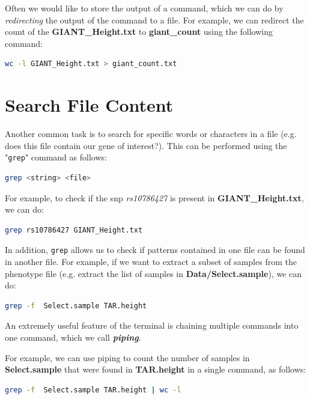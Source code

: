 \documentclass[12pt,openany]{scrbook}
\begin{document}
\noindent Often we would like to store the output of a command, which we can do by \textit{redirecting} the output of the command to a file. 
For example, we can redirect the count of the \textbf{GIANT\_Height.txt} to \textbf{giant\_count } using the following command: 

\begin{lstlisting}[language=bash]
wc -l GIANT_Height.txt > giant_count.txt 
\end{lstlisting}

\section{Search File Content}
Another common task is to search for specific words or characters in a file (e.g. does this file contain our gene of interest?). 
This can be performed using the "\lstinline|grep|" command as follows:\\

\begin{lstlisting}[language=bash]
grep <string> <file>
\end{lstlisting}

\noindent For example, to check if the \gls{snp} \emph{rs10786427} is present in \textbf{GIANT\_Height.txt}, we can do: \\
\begin{lstlisting}[language=bash]
	grep rs10786427 GIANT_Height.txt
\end{lstlisting}

\noindent In addition, \lstinline|grep| allows us to check if patterns contained in one file can be found in another file. 
\noindent For example, if we want to extract a subset of samples from the phenotype file (e.g. extract the list of samples in \textbf{Data/Select.sample}), we can do:

\begin{lstlisting}[language=bash]
grep -f  Select.sample TAR.height
\end{lstlisting}

\noindent An extremely useful feature of the terminal is chaining multiple commands into one command, which we call \textbf{\textit{piping}}.

\noindent For example, we can use piping to count the number of samples in \textbf{Select.sample} that were found in \textbf{TAR.height} in a single command, as follows:

\begin{lstlisting}[language=bash]
grep -f  Select.sample TAR.height | wc -l
\end{lstlisting}
\end{document}
